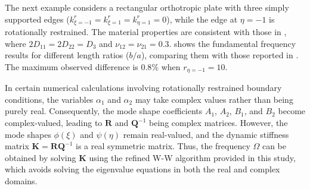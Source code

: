 \documentclass[preprint,12pt]{elsarticle}
\begin{document}
The next example considers a rectangular orthotropic plate with three simply supported edges (\(k^r_{\xi=-1} = k^r_{\xi=1} = k^r_{\eta=1} = 0\)), while the edge at \(\eta = -1\) is rotationally restrained. 
The material properties are consistent with those in \citealp{zhang2019new}, where \(2D_{11} = 2D_{22} = D_3\) and \(\nu_{12} = \nu_{21} = 0.3\).  
 shows the fundamental frequency results for different length ratios (\(b/a\)), comparing them with those reported in \citealp{zhang2019new}. 
The maximum observed difference is $0.8\%$ when \(r_{\eta=-1} = 10\). 

In certain numerical calculations involving rotationally restrained boundary conditions, the variables $\alpha_1$ and $\alpha_2$ may take complex values rather than being purely real.  
Consequently, the mode shape coefficients $A_1$, $A_2$, $B_1$, and $B_2$ become complex-valued, leading to $\mathbf{R}$ and $\mathbf{Q}^{-1}$ being complex matrices.  
However, the mode shapes $\phi(\xi)$ and $\psi(\eta)$ remain real-valued, and the dynamic stiffness matrix $\mathbf{K} = \mathbf{R}\mathbf{Q}^{-1}$ is a real symmetric matrix.
Thus, the frequency $\Omega$ can be obtained by solving $\mathbf{K}$ using the refined W-W algorithm provided in this study, which avoids solving the eigenvalue equations in both the real and complex domains.
\end{document}

